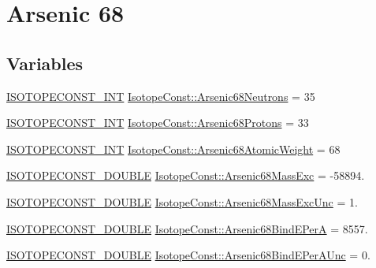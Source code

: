 \hypertarget{group___isotope_const-_arsenic-_as68}{}\section{Arsenic 68}
\label{group___isotope_const-_arsenic-_as68}
\subsection*{Variables}
\begin{DoxyCompactItemize}
\item 
\mbox{\hyperlink{group___isotope_const-_macros_ga5f18360b3e99483a35c32d789e62621c}{I\+S\+O\+T\+O\+P\+E\+C\+O\+N\+S\+T\+\_\+\+I\+NT}} \mbox{\hyperlink{group___isotope_const-_arsenic-_as68_ga85ba055499c6dfe2100d8955f6395410}{Isotope\+Const\+::\+Arsenic68\+Neutrons}} = 35
\item 
\mbox{\hyperlink{group___isotope_const-_macros_ga5f18360b3e99483a35c32d789e62621c}{I\+S\+O\+T\+O\+P\+E\+C\+O\+N\+S\+T\+\_\+\+I\+NT}} \mbox{\hyperlink{group___isotope_const-_arsenic-_as68_ga7bf1050cad4fa49a2742c7ff7c941e6e}{Isotope\+Const\+::\+Arsenic68\+Protons}} = 33
\item 
\mbox{\hyperlink{group___isotope_const-_macros_ga5f18360b3e99483a35c32d789e62621c}{I\+S\+O\+T\+O\+P\+E\+C\+O\+N\+S\+T\+\_\+\+I\+NT}} \mbox{\hyperlink{group___isotope_const-_arsenic-_as68_gaf346a876e62aca2459c074ff4f77251b}{Isotope\+Const\+::\+Arsenic68\+Atomic\+Weight}} = 68
\item 
\mbox{\hyperlink{group___isotope_const-_macros_ga8f45a7272ce02c0b4c65c44636ed719a}{I\+S\+O\+T\+O\+P\+E\+C\+O\+N\+S\+T\+\_\+\+D\+O\+U\+B\+LE}} \mbox{\hyperlink{group___isotope_const-_arsenic-_as68_ga8773edf60f71493fca3f80d2cede893c}{Isotope\+Const\+::\+Arsenic68\+Mass\+Exc}} = -\/58894.
\item 
\mbox{\hyperlink{group___isotope_const-_macros_ga8f45a7272ce02c0b4c65c44636ed719a}{I\+S\+O\+T\+O\+P\+E\+C\+O\+N\+S\+T\+\_\+\+D\+O\+U\+B\+LE}} \mbox{\hyperlink{group___isotope_const-_arsenic-_as68_ga180154a3e5801212b254e560f151684c}{Isotope\+Const\+::\+Arsenic68\+Mass\+Exc\+Unc}} = 1.
\item 
\mbox{\hyperlink{group___isotope_const-_macros_ga8f45a7272ce02c0b4c65c44636ed719a}{I\+S\+O\+T\+O\+P\+E\+C\+O\+N\+S\+T\+\_\+\+D\+O\+U\+B\+LE}} \mbox{\hyperlink{group___isotope_const-_arsenic-_as68_ga595fe607297680573f3f1fe477c6fdb9}{Isotope\+Const\+::\+Arsenic68\+Bind\+E\+PerA}} = 8557.
\item 
\mbox{\hyperlink{group___isotope_const-_macros_ga8f45a7272ce02c0b4c65c44636ed719a}{I\+S\+O\+T\+O\+P\+E\+C\+O\+N\+S\+T\+\_\+\+D\+O\+U\+B\+LE}} \mbox{\hyperlink{group___isotope_const-_arsenic-_as68_gad09fff5a1d117f56ff9101b51e39881a}{Isotope\+Const\+::\+Arsenic68\+Bind\+E\+Per\+A\+Unc}} = 0.

\end{DoxyCompactItemize}
